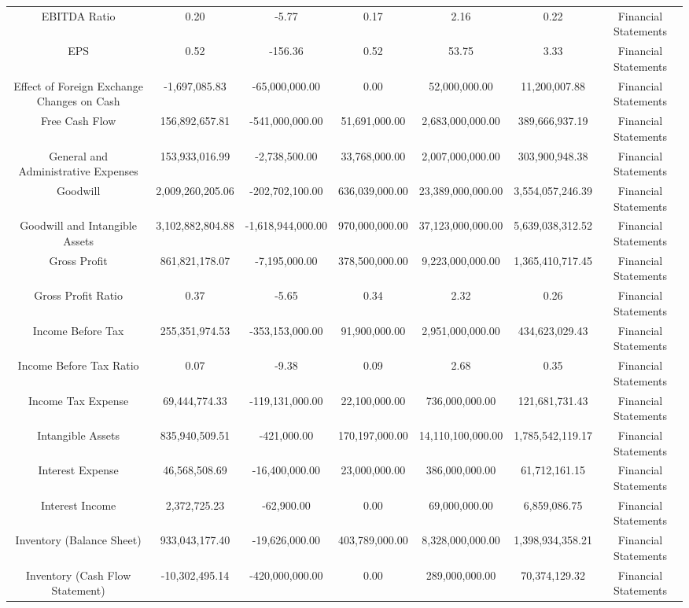 \begin{longtable}{ccccccc}
EBITDA Ratio & 0.20 & -5.77 & 0.17 & 2.16 & 0.22 & Financial Statements \\
EPS & 0.52 & -156.36 & 0.52 & 53.75 & 3.33 & Financial Statements \\
Effect of Foreign Exchange Changes on Cash & -1,697,085.83 & -65,000,000.00 & 0.00 & 52,000,000.00 & 11,200,007.88 & Financial Statements \\
Free Cash Flow & 156,892,657.81 & -541,000,000.00 & 51,691,000.00 & 2,683,000,000.00 & 389,666,937.19 & Financial Statements \\
General and Administrative Expenses & 153,933,016.99 & -2,738,500.00 & 33,768,000.00 & 2,007,000,000.00 & 303,900,948.38 & Financial Statements \\
Goodwill & 2,009,260,205.06 & -202,702,100.00 & 636,039,000.00 & 23,389,000,000.00 & 3,554,057,246.39 & Financial Statements \\
Goodwill and Intangible Assets & 3,102,882,804.88 & -1,618,944,000.00 & 970,000,000.00 & 37,123,000,000.00 & 5,639,038,312.52 & Financial Statements \\
Gross Profit & 861,821,178.07 & -7,195,000.00 & 378,500,000.00 & 9,223,000,000.00 & 1,365,410,717.45 & Financial Statements \\
Gross Profit Ratio & 0.37 & -5.65 & 0.34 & 2.32 & 0.26 & Financial Statements \\
Income Before Tax & 255,351,974.53 & -353,153,000.00 & 91,900,000.00 & 2,951,000,000.00 & 434,623,029.43 & Financial Statements \\
Income Before Tax Ratio & 0.07 & -9.38 & 0.09 & 2.68 & 0.35 & Financial Statements \\
Income Tax Expense & 69,444,774.33 & -119,131,000.00 & 22,100,000.00 & 736,000,000.00 & 121,681,731.43 & Financial Statements \\
Intangible Assets & 835,940,509.51 & -421,000.00 & 170,197,000.00 & 14,110,100,000.00 & 1,785,542,119.17 & Financial Statements \\
Interest Expense & 46,568,508.69 & -16,400,000.00 & 23,000,000.00 & 386,000,000.00 & 61,712,161.15 & Financial Statements \\
Interest Income & 2,372,725.23 & -62,900.00 & 0.00 & 69,000,000.00 & 6,859,086.75 & Financial Statements \\
Inventory (Balance Sheet) & 933,043,177.40 & -19,626,000.00 & 403,789,000.00 & 8,328,000,000.00 & 1,398,934,358.21 & Financial Statements \\
Inventory (Cash Flow Statement) & -10,302,495.14 & -420,000,000.00 & 0.00 & 289,000,000.00 & 70,374,129.32 & Financial Statements \\

\end{longtable}
